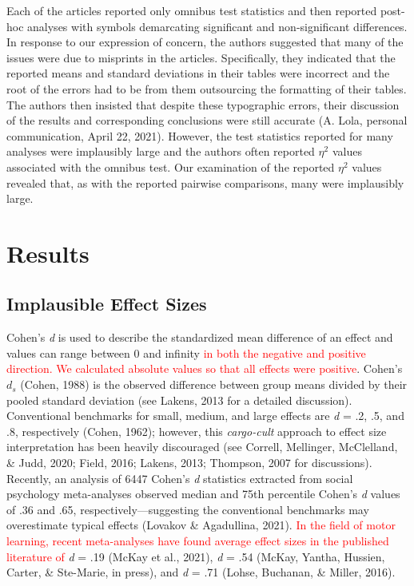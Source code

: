 \documentclass[
  english,
  man, donotrepeattitle,floatsintext]{apa7}
\begin{document}
Each of the articles reported only omnibus test statistics and then reported post-hoc analyses with symbols demarcating significant and non-significant differences. In response to our expression of concern, the authors suggested that many of the issues were due to misprints in the articles. Specifically, they indicated that the reported means and standard deviations in their tables were incorrect and the root of the errors had to be from them outsourcing the formatting of their tables. The authors then insisted that despite these typographic errors, their discussion of the results and corresponding conclusions were still accurate (A. Lola, personal communication, April 22, 2021). However, the test statistics reported for many analyses were implausibly large and the authors often reported \(\eta^{2}\) values associated with the omnibus test. Our examination of the reported \(\eta^{2}\) values revealed that, as with the reported pairwise comparisons, many were implausibly large.

\hypertarget{results}{%
\section{Results}\label{results}}

\hypertarget{implausible-effect-sizes}{%
\subsection{Implausible Effect Sizes}\label{implausible-effect-sizes}}

Cohen's \emph{d} is used to describe the standardized mean difference of an effect and values can range between 0 and infinity \textcolor{red}{in both the negative and positive direction. We calculated absolute values so that all effects were positive}. Cohen's \(d_{s}\) (Cohen, 1988) is the observed difference between group means divided by their pooled standard deviation (see Lakens, 2013 for a detailed discussion). Conventional benchmarks for small, medium, and large effects are \emph{d} = .2, .5, and .8, respectively (Cohen, 1962); however, this \emph{cargo-cult} approach to effect size interpretation has been heavily discouraged (see Correll, Mellinger, McClelland, \& Judd, 2020; Field, 2016; Lakens, 2013; Thompson, 2007 for discussions). Recently, an analysis of 6447 Cohen's \emph{d} statistics extracted from social psychology meta-analyses observed median and 75th percentile Cohen's \emph{d} values of .36 and .65, respectively---suggesting the conventional benchmarks may overestimate typical effects (Lovakov \& Agadullina, 2021). \textcolor{red}{In the field of motor learning, recent meta-analyses have found average effect sizes in the published literature of} \emph{d} = .19 (McKay et al., 2021), \emph{d} = .54 (McKay, Yantha, Hussien, Carter, \& Ste-Marie, in press), and \emph{d} = .71 (Lohse, Buchanan, \& Miller, 2016).
\end{document}
